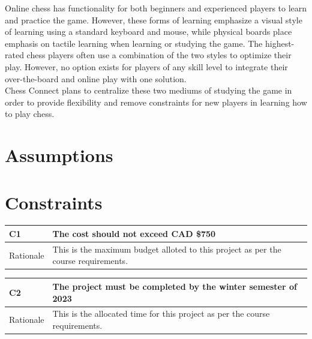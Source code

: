 \documentclass[12pt]{article}
\begin{document}
{Online chess has functionality for both beginners and experienced players to
learn and practice the game. However, these forms of learning emphasize a
visual style of learning using a standard keyboard and mouse, while physical
boards place emphasis on tactile learning when learning or studying the game.
The highest-rated chess players often use a combination of the two styles to
optimize their play. However, no option exists for players of any skill level to
integrate their over-the-board and online play with one solution.\\
Chess Connect plans to centralize these two mediums of studying the game in
order to provide flexibility and remove constraints for new players in learning
how to play chess.}


\section{Assumptions}

\section{Constraints}

\begin{table}[H]
  \centering
      \setlength{\leftmargini}{0.4cm}
      \begin{tabular}{| >{\centering\arraybackslash}m{3cm} | 
        >{\centering\arraybackslash}m{12cm} |}
      \hline
      \rowcolor[gray]{0.9}
      C1 & The cost should not exceed CAD \$750\\
      \hline 
      Rationale & This is the maximum budget alloted to this project as per the course requirements.\\
      \hline 
      \end{tabular}
  \label{Table}
  \end{table}
  
\begin{table}[H]
  \centering
      \setlength{\leftmargini}{0.4cm}
      \begin{tabular}{| >{\centering\arraybackslash}m{3cm} | 
        >{\centering\arraybackslash}m{12cm} |}
      \hline
      \rowcolor[gray]{0.9}
      C2 & The project must be completed by the winter semester of 2023\\
      \hline 
      Rationale & This is the allocated time for this project as per the course requirements.\\
      \hline 
      \end{tabular}
  \label{Table}
  \end{table}  
\end{document}
